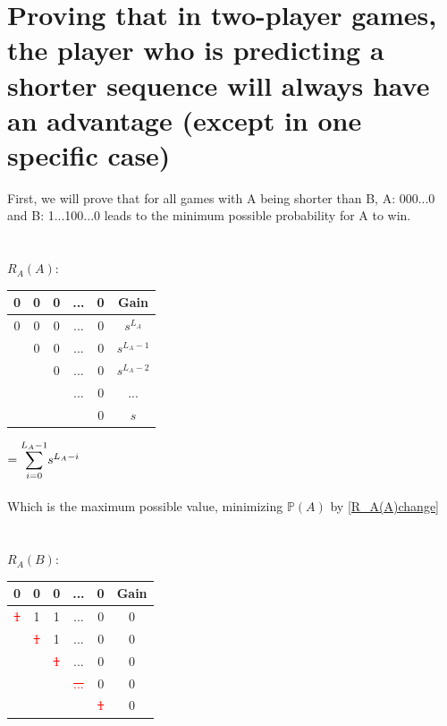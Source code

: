 \documentclass[english,12pt,a4paper,final]{article}
\begin{document}
\part{Proving that in two-player games, the player who is predicting a shorter sequence will always have an advantage (except in one specific case)}\label{shorterSequenceProof}

First, we will prove that for all games with A being shorter than B, A: 000...0 and B: 1...100...0 leads to the minimum possible probability for A to win.
\\\\\\
${R_A(A)}$:
\begin{tabular}{|ccccc|c|}
	\hline
	0 & 0 & 0 & ... & 0 & Gain \\
	\hline
	
	\textcolor{OliveGreen}{0} & \textcolor{OliveGreen}{0} & \textcolor{OliveGreen}{0} & \textcolor{OliveGreen}{...} & \textcolor{OliveGreen}{0} & $s^{L_A}$\\
	
	& \textcolor{OliveGreen}{0} & \textcolor{OliveGreen}{0} & \textcolor{OliveGreen}{...} & \textcolor{OliveGreen}{0} & $s^{L_A-1}$\\
	
	&  & \textcolor{OliveGreen}{0} & \textcolor{OliveGreen}{...} & \textcolor{OliveGreen}{0} & $s^{L_A-2}$ \\
	
	&  &  & \textcolor{OliveGreen}{...} & \textcolor{OliveGreen}{0} & ... \\
	
	&  &  &  & \textcolor{OliveGreen}{0} & $s$ \\
	\hline
\end{tabular}
$=\mathlarger\sum_{i=0}^{L_A-1}s^{L_A-i}$
\\\\
Which is the maximum possible value, minimizing $\mathbb{P}(A)$ by \eqref{R_A(A)change} 
\\\\\\
${R_A(B)}$:
\begin{tabular}{|ccccc|c|}
	\hline
	0 & 0 & 0 & ... & 0 & Gain \\
	\hline
	
	\textcolor{red}{\sout{1}} & 1 & 1 & ... & 0 & $0$\\
	
	& \textcolor{red}{\sout{1}} & 1 & ... & 0 & $0$\\
	
	&  & \textcolor{red}{\sout{1}} & ... & 0 & $0$\\
	
	&  &  & \textcolor{red}{\sout{...}} & 0 & $0$ \\
	
	&  &  &  & \textcolor{red}{\sout{1}} & $0$ \\
	\hline
\end{tabular}
\end{document}
